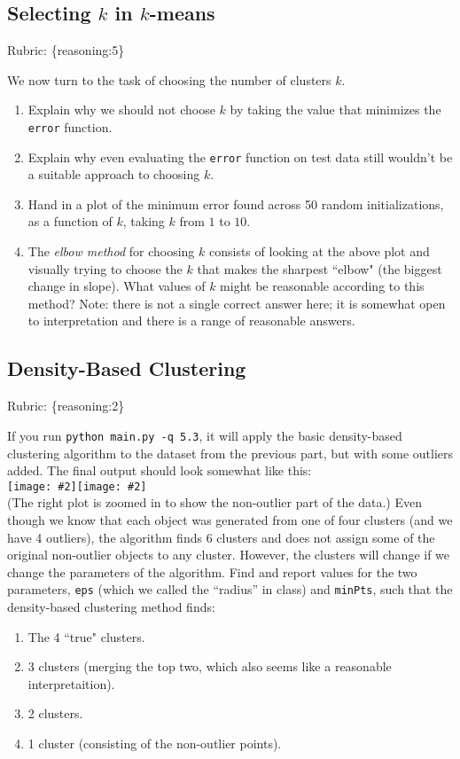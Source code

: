 \documentclass{article}
\def\rubric#1{\gre{Rubric: \{#1\}}}{}
\def\blu#1{{\color{blu}#1}}
\def\gre#1{{\color{gre}#1}}
\newcommand{\fig}[2]{\texttt{[image: \#2]}}
\def\enum#1{\begin{enumerate}#1\end{enumerate}}
\begin{document}
 \subsection{Selecting $k$ in $k$-means}
\rubric{reasoning:5}

 We now turn to the task of choosing the number of clusters $k$.

 \blu{\enum{
 \item Explain why we should not choose $k$ by taking the value that minimizes the \texttt{error} function.
 \item Explain why even evaluating the \texttt{error} function on test data still wouldn't be a suitable approach to choosing $k$.
 \item Hand in a plot of the minimum error found across 50 random initializations, as a function of $k$, taking $k$ from $1$ to $10$.
 \item The \emph{elbow method} for choosing $k$ consists of looking at the above plot and visually trying to choose the $k$ that makes the sharpest ``elbow" (the biggest change in slope). What values of $k$ might be reasonable according to this method? Note: there is not a single correct answer here; it is somewhat open to interpretation and there is a range of reasonable answers.
 }}

\subsection{Density-Based Clustering}
\rubric{reasoning:2}

If you run \texttt{python main.py -q 5.3},
it will apply the basic density-based clustering algorithm to the dataset from the previous part, but with some outliers added.
The final output should look somewhat like this:\\
\fig{.49}{../figs/density}\fig{.49}{../figs/density2}\\
(The right plot is zoomed in to show the non-outlier part of the data.)
Even though we know that each object was generated from one of four clusters (and we have 4 outliers),
 the algorithm finds 6 clusters and does not assign some of the original non-outlier
  objects to any cluster. However, the clusters will change if we change the parameters
  of the algorithm. Find and report values for the two
  parameters, \texttt{eps} (which we called the ``radius'' in class) and \texttt{minPts},
   such that the density-based clustering method finds:
\blu{\enum{
\item The 4 ``true" clusters.
\item 3 clusters (merging the top two, which also seems like a reasonable interpretaition).
\item 2 clusters.
\item 1 cluster (consisting of the non-outlier points).
}
}
\end{document}
